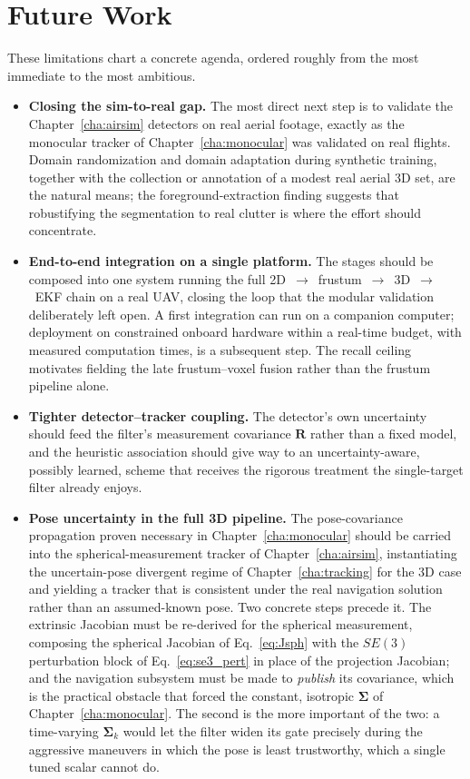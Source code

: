 \section{Future Work}

These limitations chart a concrete agenda, ordered roughly from the most
immediate to the most ambitious.

\begin{itemize}
  \item \textbf{Closing the sim-to-real gap.} The most direct next step is to
  validate the Chapter~\ref{cha:airsim} detectors on real aerial footage, exactly
  as the monocular tracker of Chapter~\ref{cha:monocular} was validated on real
  flights. Domain randomization and domain adaptation during synthetic training,
  together with the collection or annotation of a modest real aerial 3D set, are
  the natural means; the foreground-extraction finding suggests that robustifying
  the segmentation to real clutter is where the effort should concentrate.
  \item \textbf{End-to-end integration on a single platform.} The stages should be
  composed into one system running the full
  2D~$\rightarrow$~frustum~$\rightarrow$~3D~$\rightarrow$~EKF chain on a real UAV,
  closing the loop that the modular validation deliberately left open. A first
  integration can run on a companion computer; deployment on constrained onboard
  hardware within a real-time budget, with measured computation times, is a
  subsequent step. The recall ceiling motivates fielding the late
  frustum--voxel fusion rather than the frustum pipeline alone.
  \item \textbf{Tighter detector--tracker coupling.} The detector's own
  uncertainty should feed the filter's measurement covariance $\bm{R}$ rather than
  a fixed model, and the heuristic association should give way to an
  uncertainty-aware, possibly learned, scheme that receives the rigorous treatment
  the single-target filter already enjoys.
  \item \textbf{Pose uncertainty in the full 3D pipeline.} The pose-covariance
  propagation proven necessary in Chapter~\ref{cha:monocular} should be carried
  into the spherical-measurement tracker of Chapter~\ref{cha:airsim}, instantiating
  the uncertain-pose divergent regime of Chapter~\ref{cha:tracking} for the 3D
  case and yielding a tracker that is consistent under the real navigation
  solution rather than an assumed-known pose. Two concrete steps precede it. The
  extrinsic Jacobian must be re-derived for the spherical measurement, composing
  the spherical Jacobian of Eq.~\eqref{eq:Jsph} with the $SE(3)$ perturbation
  block of Eq.~\eqref{eq:se3_pert} in place of the projection Jacobian; and the
  navigation subsystem must be made to \emph{publish} its covariance, which is the
  practical obstacle that forced the constant, isotropic $\bm{\Sigma}$ of
  Chapter~\ref{cha:monocular}. The second is the more important of the two: a
  time-varying $\bm{\Sigma}_k$ would let the filter widen its gate precisely
  during the aggressive maneuvers in which the pose is least trustworthy, which a
  single tuned scalar cannot do.


\end{itemize}
